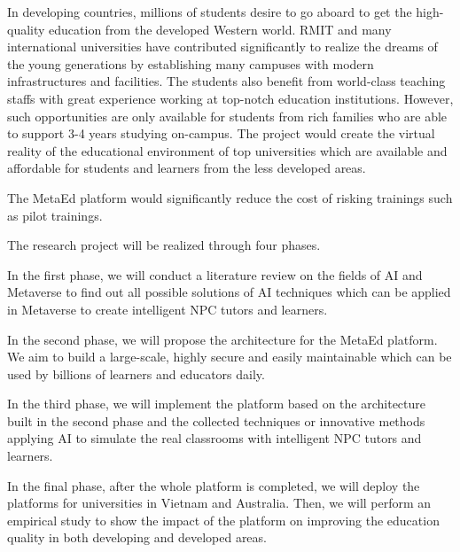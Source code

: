 \documentclass[
    ngerman,american
    ]{scrartcl}
\begin{document}
          In developing countries, millions of students desire to go aboard to get
         the high-quality education from the developed Western world. RMIT and many international 
         universities have contributed significantly to realize the dreams of the young generations by establishing 
         many campuses with modern infrastructures and facilities. The students also benefit from world-class 
         teaching staffs with great experience working at top-notch education institutions. However, such opportunities 
         are only available for students from rich families who are able to support 3-4 years studying on-campus. 
         The project would create the virtual reality of the educational environment of top universities which are 
         available and affordable for students and learners from the less developed areas.
         \par
         The MetaEd platform would significantly reduce the cost of risking trainings such as pilot trainings.
        
    
    	\sectionMethod
	The research project will be realized through four phases.
	\begin{description}{}
	\item [\phaseOne] 
	In the first phase, we will conduct a literature review on the fields of AI and Metaverse to find out all possible solutions
	of AI techniques which can be applied in Metaverse to create intelligent NPC tutors and learners.
	
	\item [\phaseTwo]
	In the second phase, we will propose the architecture for the MetaEd platform. We aim to build a large-scale, highly secure 
	and easily maintainable which can be used by billions of learners and educators daily.  
	
	\item [\phaseThree]
	In the third phase, we will implement the platform based on the architecture built in the second phase and the collected techniques 
	or innovative methods applying AI to simulate the real classrooms with intelligent NPC tutors and learners.
	
	\item [\phaseFour]
	In the final phase, after the whole platform is completed, we will deploy the platforms for universities in Vietnam and Australia.
	Then, we will perform an empirical study to show the impact of the platform on improving the education quality in both developing
	and developed areas. 
	
	\end{description}{}	
	
\end{document}
